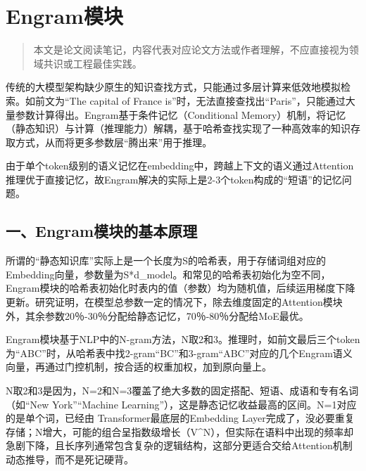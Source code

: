 \setcounter{section}{1}

\hypertarget{engramux6a21ux5757}{%
\section{Engram模块}\label{engramux6a21ux5757}}

\begin{quote}
本文是论文阅读笔记，内容代表对应论文方法或作者理解，不应直接视为领域共识或工程最佳实践。
\end{quote}

传统的大模型架构缺少原生的知识查找方式，只能通过多层计算来低效地模拟检索。如前文为``The capital of France is''时，无法直接查找出``Paris''，只能通过大量参数计算得出。Engram基于条件记忆（Conditional Memory）机制，将记忆（静态知识）与计算（推理能力）解耦，基于哈希查找实现了一种高效率的知识存取方式，从而将更多参数层``腾出来''用于推理。

由于单个token级别的语义记忆在embedding中，跨越上下文的语义通过Attention推理优于直接记忆，故Engram解决的实际上是2-3个token构成的``短语''的记忆问题。

\hypertarget{ux4e00engramux6a21ux5757ux7684ux57faux672cux539fux7406}{%
\subsection{一、Engram模块的基本原理}\label{ux4e00engramux6a21ux5757ux7684ux57faux672cux539fux7406}}

所谓的``静态知识库''实际上是一个长度为S的哈希表，用于存储词组对应的Embedding向量，参数量为S*d\_model。和常见的哈希表初始化为空不同，Engram模块的哈希表初始化时表内的值（参数）均为随机值，后续运用梯度下降更新。研究证明，在模型总参数一定的情况下，除去维度固定的Attention模块外，其余参数20％-30％分配给静态记忆，70％-80％分配给MoE最优。

Engram模块基于NLP中的N-gram方法，N取2和3。推理时，如前文最后三个token为``ABC''时，从哈希表中找2-gram``BC''和3-gram``ABC''对应的几个Engram语义向量，再通过门控机制，按合适的权重加权，加到原向量上。

N取2和3是因为，N=2和N=3覆盖了绝大多数的固定搭配、短语、成语和专有名词（如``New York''``Machine Learning''），这是静态记忆收益最高的区间。N=1对应的是单个词，已经由 Transformer最底层的Embedding Layer完成了，没必要重复存储；N增大，可能的组合呈指数级增长（V\^{}N），但实际在语料中出现的频率却急剧下降，且长序列通常包含复杂的逻辑结构，这部分更适合交给Attention机制动态推导，而不是死记硬背。


